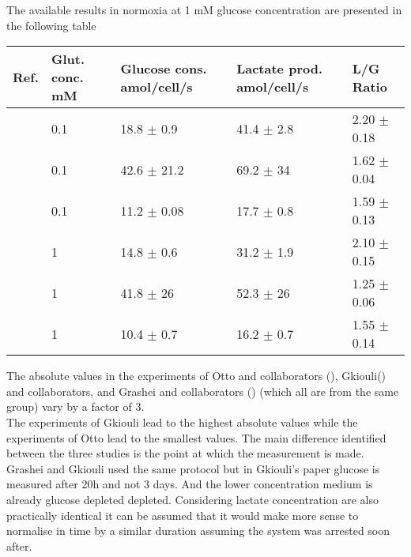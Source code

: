 \documentclass[11pt,a4paper]{article}
\begin{document}
The available results in normoxia at 1 mM glucose concentration are presented in the following table 

\begin{table}[h!]
\begin{center}
\begin{tabular}{ |p{7mm}|p{12mm}|p{21mm}|p{23mm}|p{25mm}| }
 \hline
 \textbf{Ref.} & \textbf{Glut. conc.}  mM & \textbf{Glucose cons.} amol/cell/s & \textbf{Lactate prod.} amol/cell/s& \textbf{L/G Ratio} \\
 \hline
    \cite{Grashei2022} & 0.1 &  18.8 $\pm$  0.9  & 41.4  $\pm$  2.8  & 2.20  $\pm$ 0.18  \\
    \hline
   \cite{Gkiouli2019} & 0.1 &  42.6 $\pm$  21.2  & 69.2  $\pm$  34  & 1.62  $\pm$ 0.04  \\
    \hline
   \cite{Otto2015} & 0.1 & 11.2 $\pm$  0.08  & 17.7 $\pm$  0.8 & 1.59 $\pm$  0.13 \\
   \hline
    \cite{Grashei2022} & 1 &  14.8 $\pm$  0.6  & 31.2  $\pm$  1.9  & 2.10  $\pm$ 0.15  \\
    \hline
  \cite{Gkiouli2019} & 1 &   41.8  $\pm$ 26 &  52.3 $\pm$  26   & 1.25 $\pm$  0.06 \\
   \hline
  \cite{Otto2015} & 1 &   10.4  $\pm$ 0.7 &  16.2 $\pm$  0.7   & 1.55 $\pm$  0.14 \\
   \hline
\end{tabular}
\end{center}
\end{table}

The absolute values in the experiments of Otto and collaborators (\cite{Otto2015}), Gkiouli(\cite{Gkiouli2019}) and collaborators, and Grashei and collaborators (\cite{Grashei2022}) (which all are from the same group) vary by a factor of 3.\\ 

The experiments of Gkiouli lead to the highest absolute values while the experiments of Otto lead to the smallest values. The main difference identified between the three studies is the point at which the measurement is made. Grashei and Gkiouli used the same protocol but in Gkiouli's paper glucose is measured after 20h and not 3 days. And the lower concentration medium is already glucose depleted depleted. Considering lactate concentration are also practically identical it can be assumed that it would make more sense to normalise in time by a similar duration assuming the system was arrested soon after.\\
\end{document}
